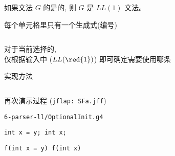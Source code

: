 \begin{frame}{}
  \begin{center}
    \begin{definition}[$LL(1)$文法]
      如果文法 $G$ 的是的,
      则 $G$ 是 $LL(1)$ 文法。
    \end{definition}

     每个单元格里只有一个生成式(编号) \\[8pt]

    \begin{columns}
        
        
    \end{columns}

    \vspace{0.60cm}
    对于当前选择的, \\[4pt]
    仅根据输入中 ($LL(\red{1})$) 即可确定需要使用哪条
  \end{center}
\end{frame}

\begin{frame}{}
  \begin{center}
    {\large {}实现方法}

    \begin{columns}
        
        
        
    \end{columns}
  \end{center}
\end{frame}

\begin{frame}{}
  \begin{center}
    再次演示过程 (\texttt{jflap: SFa.jff})

    \vspace{0.30cm}
  \end{center}
\end{frame}

\begin{frame}{}
  \begin{center}
    \texttt{6-parser-ll/OptionalInit.g4}

    \pause
    \texttt{int x = y; \qquad int x;}

    \pause
    \vspace{0.20cm}
    \texttt{f(int x = y) \qquad f(int x)}
  \end{center}
\end{frame}

